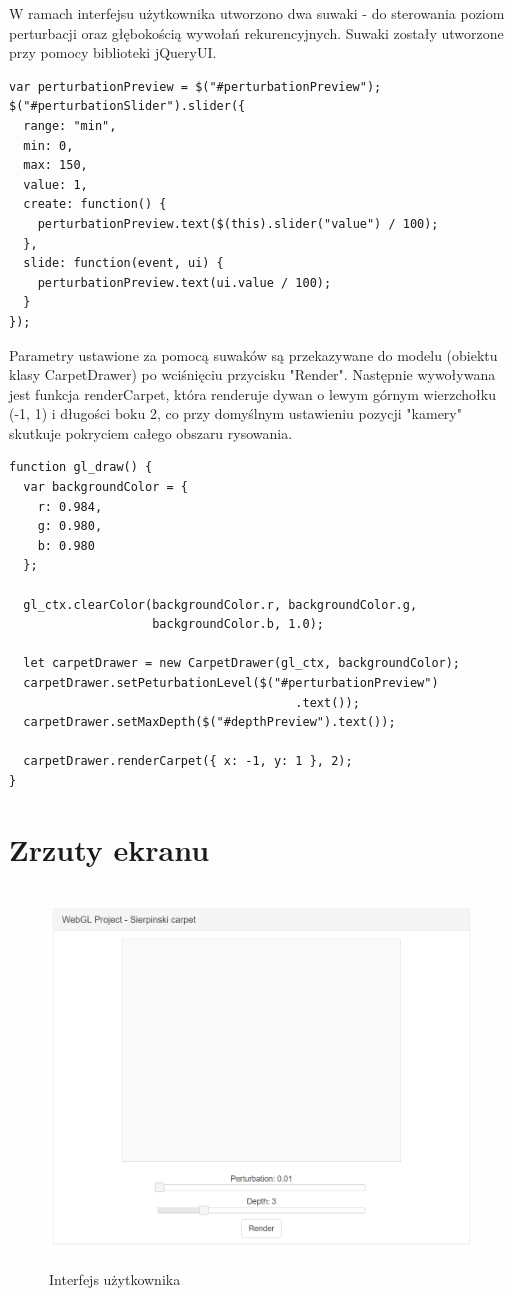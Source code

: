 \documentclass[a4paper,11pt]{article}
\begin{document}
W ramach interfejsu użytkownika utworzono dwa suwaki - do sterowania poziom perturbacji oraz głębokością wywołań rekurencyjnych. Suwaki zostały utworzone przy pomocy biblioteki jQueryUI. 

\begin{lstlisting}[caption=Utworzenie suwaka dla zmian poziomu perturbacji]
var perturbationPreview = $("#perturbationPreview");
$("#perturbationSlider").slider({
  range: "min",
  min: 0,
  max: 150,
  value: 1,
  create: function() {
    perturbationPreview.text($(this).slider("value") / 100);
  },
  slide: function(event, ui) {
    perturbationPreview.text(ui.value / 100);
  }
});
\end{lstlisting}

Parametry ustawione za pomocą suwaków są przekazywane do modelu (obiektu klasy CarpetDrawer) po wciśnięciu przycisku "Render". Następnie wywoływana jest funkcja renderCarpet, która renderuje dywan o lewym górnym wierzchołku (-1, 1) i długości boku 2, co przy domyślnym ustawieniu pozycji "kamery" skutkuje pokryciem całego obszaru rysowania.

\begin{lstlisting}[caption=Metoda wywołująca się przy nacisnięciu przycisku "Render"]
function gl_draw() {
  var backgroundColor = {
    r: 0.984,
    g: 0.980,
    b: 0.980
  };

  gl_ctx.clearColor(backgroundColor.r, backgroundColor.g, 
					backgroundColor.b, 1.0);

  let carpetDrawer = new CarpetDrawer(gl_ctx, backgroundColor);
  carpetDrawer.setPeturbationLevel($("#perturbationPreview")
										.text());
  carpetDrawer.setMaxDepth($("#depthPreview").text());

  carpetDrawer.renderCarpet({ x: -1, y: 1 }, 2);
}
\end{lstlisting}


\section{Zrzuty ekranu}

\begin{figure}[H]
\centering
 \includegraphics[height=10cm]{sierp.PNG}
\caption{Interfejs użytkownika}
\end{figure}
\end{document}
